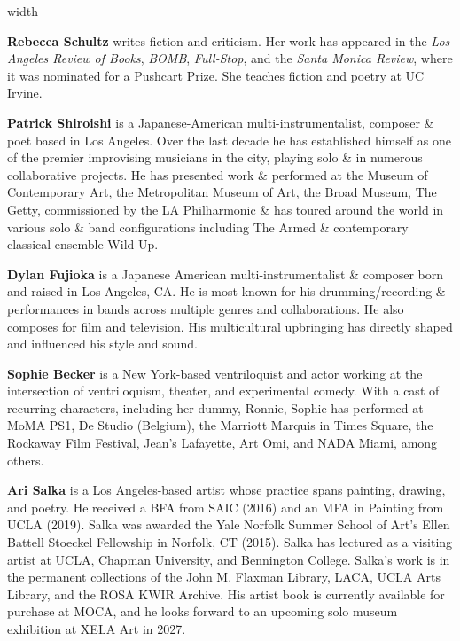 \documentclass[10pt,letterpaper,landscape]{article}
\newlength{\foldsep}
\newlength{\foldrulewidth}
\newlength{\panelwidth}
\newlength{\panelheight}
\newcommand{\foldrule}{\hspace{\foldsep}\vrule width \foldrulewidth\hspace{\foldsep}}
\newcommand{\panel}[1]{%
  \begin{minipage}[t][\panelheight][t]{\panelwidth}%
    \raggedright #1%
  \end{minipage}%
}
\newcommand{\panellabel}[1]{}
\newcommand{\biosize}{\fontsize{5.65}{6.35}\selectfont}
\begin{document}
\foldrule
\panel{
  \panellabel{Right Inside}
  \biosize
  \textbf{Rebecca Schultz} writes fiction and criticism. Her work has appeared in the \textit{Los Angeles Review of Books}, \textit{BOMB}, \textit{Full-Stop}, and the \textit{Santa Monica Review}, where it was nominated for a Pushcart Prize. She teaches fiction and poetry at UC Irvine.

  \textbf{Patrick Shiroishi} is a Japanese-American multi-instrumentalist, composer \& poet based in Los Angeles. Over the last decade he has established himself as one of the premier improvising musicians in the city, playing solo \& in numerous collaborative projects. He has presented work \& performed at the Museum of Contemporary Art, the Metropolitan Museum of Art, the Broad Museum, The Getty, commissioned by the LA Philharmonic \& has toured around the world in various solo \& band configurations including The Armed \& contemporary classical ensemble Wild Up.

  \textbf{Dylan Fujioka} is a Japanese American multi-instrumentalist \& composer born and raised in Los Angeles, CA. He is most known for his drumming/recording \& performances in bands across multiple genres and collaborations. He also composes for film and television. His multicultural upbringing has directly shaped and influenced his style and sound.

  \textbf{Sophie Becker} is a New York-based ventriloquist and actor working at the intersection of ventriloquism, theater, and experimental comedy. With a cast of recurring characters, including her dummy, Ronnie, Sophie has performed at MoMA PS1, De Studio (Belgium), the Marriott Marquis in Times Square, the Rockaway Film Festival, Jean's Lafayette, Art Omi, and NADA Miami, among others.

  \textbf{Ari Salka} is a Los Angeles-based artist whose practice spans painting, drawing, and poetry. He received a BFA from SAIC (2016) and an MFA in Painting from UCLA (2019). Salka was awarded the Yale Norfolk Summer School of Art's Ellen Battell Stoeckel Fellowship in Norfolk, CT (2015). Salka has lectured as a visiting artist at UCLA, Chapman University, and Bennington College. Salka's work is in the permanent collections of the John M. Flaxman Library, LACA, UCLA Arts Library, and the ROSA KWIR Archive. His artist book is currently available for purchase at MOCA, and he looks forward to an upcoming solo museum exhibition at XELA Art in 2027.
}
\end{document}
